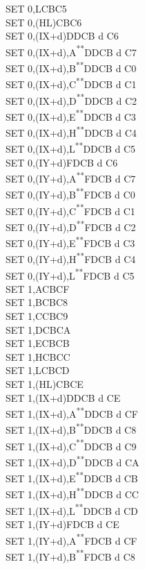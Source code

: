 \documentclass[12pt,twoside,openright,a4paper]{book}
\newcommand{\UNDOC}{\textnormal{\textsuperscript{**}}}
\begin{document}
\begin{multicols}{3}
{\begin{tabbing}
		SET 0,L\>CBC5\\
		SET 0,(HL)\>CBC6\\
		SET 0,(IX+d)\>DDCB d C6\\
		SET 0,(IX+d),A\UNDOC\>DDCB d C7\\
		SET 0,(IX+d),B\UNDOC\>DDCB d C0\\
		SET 0,(IX+d),C\UNDOC\>DDCB d C1\\
		SET 0,(IX+d),D\UNDOC\>DDCB d C2\\
		SET 0,(IX+d),E\UNDOC\>DDCB d C3\\
		SET 0,(IX+d),H\UNDOC\>DDCB d C4\\
		SET 0,(IX+d),L\UNDOC\>DDCB d C5\\
		SET 0,(IY+d)\>FDCB d C6\\
		SET 0,(IY+d),A\UNDOC\>FDCB d C7\\
		SET 0,(IY+d),B\UNDOC\>FDCB d C0\\
		SET 0,(IY+d),C\UNDOC\>FDCB d C1\\
		SET 0,(IY+d),D\UNDOC\>FDCB d C2\\
		SET 0,(IY+d),E\UNDOC\>FDCB d C3\\
		SET 0,(IY+d),H\UNDOC\>FDCB d C4\\
		SET 0,(IY+d),L\UNDOC\>FDCB d C5\\
		SET 1,A\>CBCF\\
		SET 1,B\>CBC8\\
		SET 1,C\>CBC9\\
		SET 1,D\>CBCA\\
		SET 1,E\>CBCB\\
		SET 1,H\>CBCC\\
		SET 1,L\>CBCD\\
		SET 1,(HL)\>CBCE\\
		SET 1,(IX+d)\>DDCB d CE\\
		SET 1,(IX+d),A\UNDOC\>DDCB d CF\\
		SET 1,(IX+d),B\UNDOC\>DDCB d C8\\
		SET 1,(IX+d),C\UNDOC\>DDCB d C9\\
		SET 1,(IX+d),D\UNDOC\>DDCB d CA\\
		SET 1,(IX+d),E\UNDOC\>DDCB d CB\\
		SET 1,(IX+d),H\UNDOC\>DDCB d CC\\
		SET 1,(IX+d),L\UNDOC\>DDCB d CD\\
		SET 1,(IY+d)\>FDCB d CE\\
		SET 1,(IY+d),A\UNDOC\>FDCB d CF\\
		SET 1,(IY+d),B\UNDOC\>FDCB d C8\\

\end{tabbing}}
\end{multicols}
\end{document}
